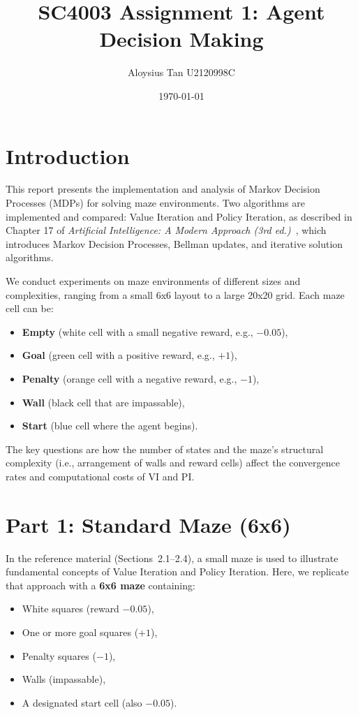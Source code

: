 \documentclass[11pt]{article}
\title{SC4003 Assignment 1: Agent Decision Making}
\author{Aloysius Tan U2120998C}
\date{\today}
\begin{document}


\tableofcontents
\newpage 

\section{Introduction}
This report presents the implementation and analysis of Markov Decision Processes (MDPs) for
solving maze environments. Two algorithms are implemented and compared: Value Iteration
and Policy Iteration, as described in Chapter 17 of \emph{Artificial Intelligence: A Modern Approach (3rd ed.)}~\cite{AIMA}, which introduces Markov Decision Processes, Bellman updates, and iterative solution algorithms.


\noindent We conduct experiments on maze environments of different sizes and complexities, ranging from a small 6x6 layout to a large 20x20 grid. Each maze cell can be:
\begin{itemize}
    \item \textbf{Empty} (white cell with a small negative reward, e.g., $-0.05$),
    \item \textbf{Goal} (green cell with a positive reward, e.g., $+1$),
    \item \textbf{Penalty} (orange cell with a negative reward, e.g., $-1$),
    \item \textbf{Wall} (black cell that are impassable),
    \item \textbf{Start} (blue cell where the agent begins).
\end{itemize}
The key questions are how the number of states and the maze's structural complexity (i.e., arrangement of walls and reward cells) affect the convergence rates and computational costs of VI and PI.

\section{Part 1: Standard Maze (6x6)}
\label{sec:part1}

In the reference material (Sections~2.1--2.4), a small maze is used to illustrate fundamental concepts of Value Iteration and Policy Iteration. Here, we replicate that approach with a \textbf{6x6 maze} containing:
\begin{itemize}
    \item White squares (reward $-0.05$),
    \item One or more goal squares ($+1$),
    \item Penalty squares ($-1$),
    \item Walls (impassable),
    \item A designated start cell (also $-0.05$).
\end{itemize}
\end{document}
